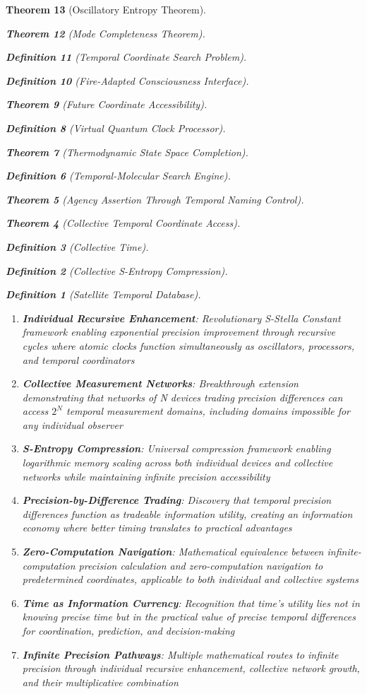 \documentclass[12pt,a4paper]{article}
\newtheorem{theorem}{Theorem}[section]
\newtheorem{definition}[theorem]{Definition}
\begin{document}
\begin{theorem}[Oscillatory Entropy Theorem]
\begin{theorem}[Mode Completeness Theorem]
\begin{enumerate}
\begin{definition}[Temporal Coordinate Search Problem]
\begin{algorithm}
\begin{definition}[Fire-Adapted Consciousness Interface]
\begin{theorem}[Future Coordinate Accessibility]
\begin{definition}[Virtual Quantum Clock Processor]
\begin{itemize}
\begin{itemize}
\begin{theorem}[Thermodynamic State Space Completion]
\begin{definition}[Temporal-Molecular Search Engine]
\begin{theorem}[Agency Assertion Through Temporal Naming Control]
\begin{remark}
\begin{theorem}[Collective Temporal Coordinate Access]
\begin{definition}[Collective Time]
\begin{definition}[Collective S-Entropy Compression]
\begin{definition}[Satellite Temporal Database]
\begin{algorithm}
\begin{table}[h]
{{\begin{enumerate}
\item \textbf{Individual Recursive Enhancement}: Revolutionary S-Stella Constant framework enabling exponential precision improvement through recursive cycles where atomic clocks function simultaneously as oscillators, processors, and temporal coordinators

\item \textbf{Collective Measurement Networks}: Breakthrough extension demonstrating that networks of N devices trading precision differences can access $2^N$ temporal measurement domains, including domains impossible for any individual observer

\item \textbf{S-Entropy Compression}: Universal compression framework enabling logarithmic memory scaling across both individual devices and collective networks while maintaining infinite precision accessibility

\item \textbf{Precision-by-Difference Trading}: Discovery that temporal precision differences function as tradeable information utility, creating an information economy where better timing translates to practical advantages

\item \textbf{Zero-Computation Navigation}: Mathematical equivalence between infinite-computation precision calculation and zero-computation navigation to predetermined coordinates, applicable to both individual and collective systems

\item \textbf{Time as Information Currency}: Recognition that time's utility lies not in knowing precise time but in the practical value of precise temporal differences for coordination, prediction, and decision-making

\item \textbf{Infinite Precision Pathways}: Multiple mathematical routes to infinite precision through individual recursive enhancement, collective network growth, and their multiplicative combination


\end{enumerate}}}
\end{table}
\end{algorithm}
\end{definition}
\end{definition}
\end{definition}
\end{theorem}
\end{remark}
\end{theorem}
\end{definition}
\end{theorem}
\end{itemize}
\end{itemize}
\end{definition}
\end{theorem}
\end{definition}
\end{algorithm}
\end{definition}
\end{enumerate}
\end{theorem}
\end{theorem}
\end{document}
